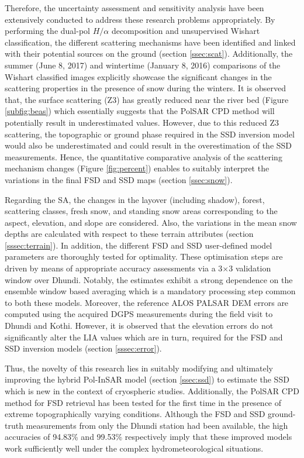 \documentclass[review]{elsarticle}
\numberwithin{equation}{section}
\numberwithin{figure}{section}
\numberwithin{table}{section}
\begin{document}
Therefore, the uncertainty assessment and sensitivity analysis have been extensively conducted to address these research problems appropriately. By performing the dual-pol $H/{\alpha}$ decomposition and unsupervised Wishart classification, the different scattering mechanisms have been identified and linked with their potential sources on the ground (section \ref{ssec:scat}). Additionally, the summer (June 8, 2017) and wintertime (January 8, 2016) comparisons of the Wishart classified images explicitly showcase the significant changes in the scattering properties in the presence of snow during the winters. It is observed that, the surface scattering (Z3) has greatly reduced near the river bed (Figure \ref{subfig:beas}) which essentially suggests that the PolSAR CPD method will potentially result in underestimated values. However, due to this reduced Z3 scattering, the topographic or ground phase required in the SSD inversion model would also be underestimated and could result in the overestimation of the SSD measurements. Hence, the quantitative comparative analysis of the scattering mechanism changes (Figure \ref{fig:percent}) enables to suitably interpret the variations in the final FSD and SSD maps (section \ref{ssec:snow}).

Regarding the SA, the changes in the layover (including shadow), forest, scattering classes, fresh snow, and standing snow areas corresponding to the aspect, elevation, and slope are considered. Also, the variations in the mean snow depths are calculated with respect to these terrain attributes (section \ref{sssec:terrain}). In addition, the different FSD and SSD user-defined model parameters are thoroughly tested for optimality. These optimisation steps are driven by means of appropriate accuracy assessments via a 3$\times$3 validation window over Dhundi. Notably, the estimates exhibit a strong dependence on the ensemble window based averaging which is a mandatory processing step common to both these models. Moreover, the reference ALOS PALSAR DEM errors are computed using the acquired DGPS measurements during the field visit to Dhundi and Kothi. However, it is observed that the elevation errors do not significantly alter the LIA values which are in turn, required for the FSD and SSD inversion models (section \ref{sssec:error}).

Thus, the novelty of this research lies in suitably modifying and ultimately improving the hybrid Pol-InSAR model (section \ref{ssec:ssd}) to estimate the SSD which is new in the context of cryospheric studies. Additionally, the PolSAR CPD method for FSD retrieval has been tested for the first time in the presence of extreme topographically varying conditions. Although the FSD and SSD ground-truth measurements from only the Dhundi station had been available, the high accuracies of 94.83\% and 99.53\% respectively imply that these improved models work sufficiently well under the complex hydrometeorological situations.
\end{document}

